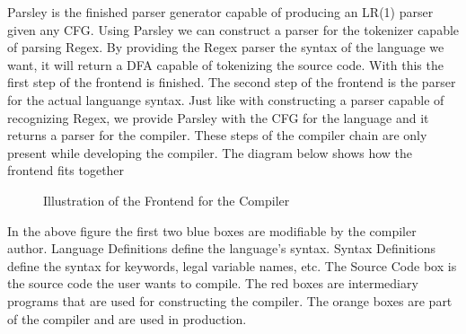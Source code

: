 Parsley is the finished parser generator capable of producing an LR(1) parser given any CFG. Using Parsley we can construct a parser for the tokenizer capable of parsing Regex. By providing the Regex parser the syntax of the language we want, it will return a DFA capable of tokenizing the source code. With this the first step of the frontend is finished. The second step of the frontend is the parser for the actual languange syntax. Just like with constructing a parser capable of recognizing Regex, we provide Parsley with the CFG for the language and it returns a parser for the compiler. These steps of the compiler chain are only present while  developing the compiler. The diagram below shows how the frontend fits together
\begin{figure}[H]
\caption{Illustration of the Frontend for the Compiler}
\end{figure}

In the above figure the first two blue boxes are modifiable by the compiler author. Language Definitions define the language's syntax. Syntax Definitions define the syntax for keywords, legal variable names, etc. The Source Code box is the source code the user wants to compile. The red boxes are intermediary programs that are used for constructing the compiler. The orange boxes are part of the compiler and are used in production.
